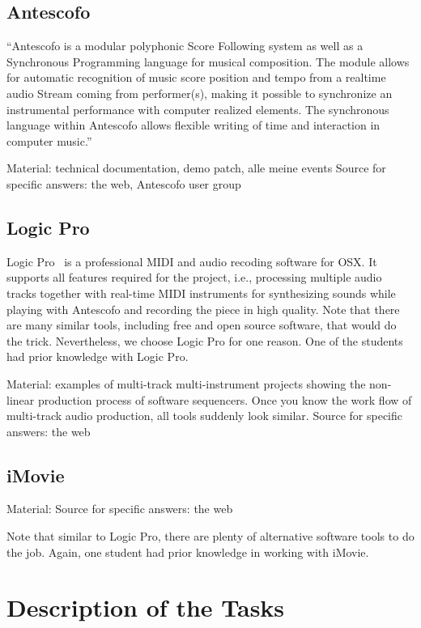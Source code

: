 \documentclass[onecolumn,nocopyrightspace,preprint]{sigplanconf}
\begin{document}
\subsection{Antescofo}

``Antescofo is a modular polyphonic Score Following system as well as a
Synchronous Programming language for musical composition. The module allows
for automatic recognition of music score position and tempo from a realtime
audio Stream coming from performer(s), making it possible to synchronize an
instrumental performance with computer realized elements. The synchronous
language within Antescofo allows flexible writing of time and interaction in
computer music.''~\cite{website:antescofo}

Material: technical documentation, demo patch, alle meine events
Source for specific answers: the web, Antescofo user group

\subsection{Logic Pro}

Logic Pro~\cite{website:logic} is a professional MIDI and audio recoding
software for OSX. It supports all features required for the project, i.e.,
processing multiple audio tracks together with real-time MIDI instruments for
synthesizing sounds while playing with Antescofo and recording the piece in
high quality.  Note that there are many similar tools, including free and open
source software, that would do the trick. Nevertheless, we choose Logic Pro
for one reason. One of the students had prior knowledge with Logic Pro.


Material: examples of multi-track multi-instrument projects showing
the non-linear production process of software sequencers. Once you know
the work flow of multi-track audio production, all tools suddenly look similar.
Source for specific answers: the web

\subsection{iMovie}

Material: 
Source for specific answers: the web


Note that similar to Logic Pro, there are plenty of alternative software
tools to do the job. Again, one student had prior knowledge in working
with iMovie. 


\section{Description of the Tasks}
\end{document}
